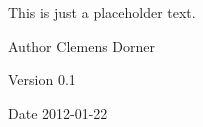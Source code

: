 This is just a placeholder text.

\begin{DoxyAuthor}{Author}
Clemens Dorner 
\end{DoxyAuthor}
\begin{DoxyVersion}{Version}
0.1 
\end{DoxyVersion}
\begin{DoxyDate}{Date}
2012-\/01-\/22 
\end{DoxyDate}
